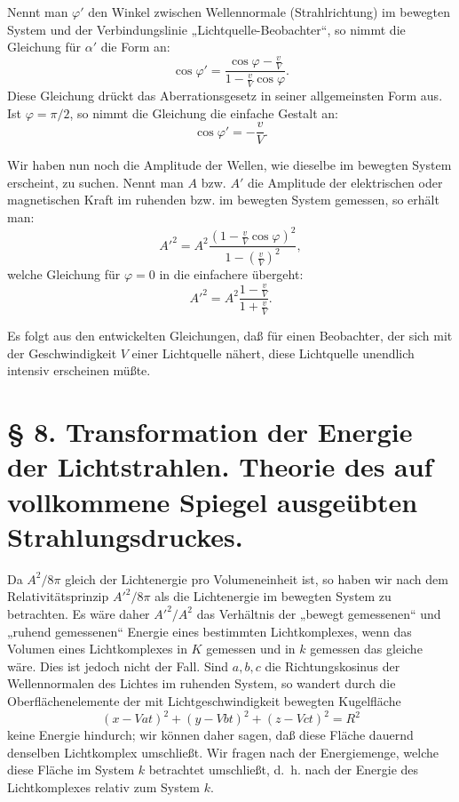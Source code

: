 \documentclass[17pt]{webarticle}       %
\begin{document}
Nennt man \(\varphi'\) den Winkel zwischen Wellennormale (Strahlrichtung) im bewegten System und der Verbindungslinie „Lichtquelle-Beobachter“, so nimmt die Gleichung für \(\alpha'\) die Form an:
\[
\cos \varphi' = \frac{\cos \varphi - \frac{v}{V}}{1 - \frac{v}{V} \cos \varphi}.
\]
Diese Gleichung drückt das Aberrationsgesetz in seiner allgemeinsten Form aus. Ist \( \varphi = \pi/2 \), so nimmt die Gleichung die einfache Gestalt an:
\[
\cos \varphi' = -\frac{v}{V}.
\]

Wir haben nun noch die Amplitude der Wellen, wie dieselbe im bewegten System erscheint, zu suchen. Nennt man \( A \) bzw. \( A' \) die Amplitude der elektrischen oder magnetischen Kraft im ruhenden bzw. im bewegten System gemessen, so erhält man:
\[
A'^2 = A^2 \frac{\left(1 - \frac{v}{V} \cos \varphi\right)^2}{1 - \left( \frac{v}{V} \right)^2},
\]
welche Gleichung für \( \varphi = 0 \) in die einfachere übergeht:
\[
A'^2 = A^2 \frac{1 - \frac{v}{V}}{1 + \frac{v}{V}}.
\]

Es folgt aus den entwickelten Gleichungen, daß für einen Beobachter, der sich mit der Geschwindigkeit \( V \) einer Lichtquelle nähert, diese Lichtquelle unendlich intensiv erscheinen müßte.

\section*{§ 8. Transformation der Energie der Lichtstrahlen. Theorie des auf vollkommene Spiegel ausgeübten Strahlungsdruckes.}

Da \( A^2 / 8\pi \) gleich der Lichtenergie pro Volumeneinheit ist, so haben wir nach dem Relativitätsprinzip \( A'^2 / 8\pi \) als die Lichtenergie im bewegten System zu betrachten. Es wäre daher \( A'^2 / A^2 \) das Verhältnis der „bewegt gemessenen“ und „ruhend gemessenen“ Energie eines bestimmten Lichtkomplexes, wenn das Volumen eines Lichtkomplexes in \( K \) gemessen und in \( k \) gemessen das gleiche wäre. Dies ist jedoch nicht der Fall. Sind \( a, b, c \) die Richtungskosinus der Wellennormalen des Lichtes im ruhenden System, so wandert durch die Oberflächenelemente der mit Lichtgeschwindigkeit bewegten Kugelfläche
\[
(x - Va t)^2 + (y - Vb t)^2 + (z - Vc t)^2 = R^2
\]
keine Energie hindurch; wir können daher sagen, daß diese Fläche dauernd denselben Lichtkomplex umschließt. Wir fragen nach der Energiemenge, welche diese Fläche im System \( k \) betrachtet umschließt, d.~h. nach der Energie des Lichtkomplexes relativ zum System \( k \).
\end{document}
